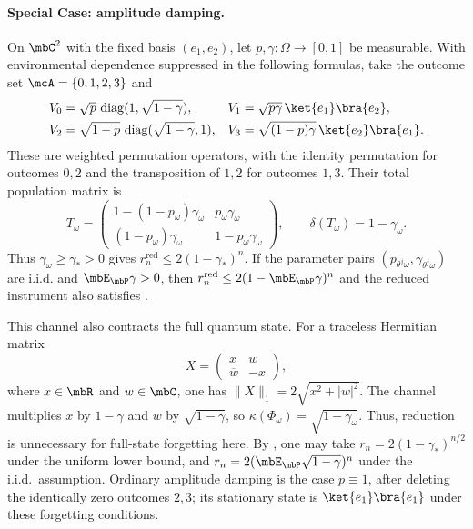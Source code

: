 \documentclass[a4paper]{article}
\numberwithin{equation}{section}   %
\theoremstyle{plain}   %
\theoremstyle{plain}   %
\theoremstyle{examplestyle}
\DeclareMathOperator{\pr}{\mbP}           %
\begin{document}
        \paragraph{Special Case: amplitude damping.}
        \label{par:amplitude-damping}
            On $\mbC^2$ with the fixed basis $(e_1,e_2)$, let $p,\gamma:\Omega\to[0,1]$ be measurable.
            With environmental dependence suppressed in the following formulas, take the outcome set $\mcA=\{0,1,2,3\}$ and
            \[
                \begin{aligned}
                 V_0&=\sqrt p\,\operatorname{diag}(1,\sqrt{1-\gamma}),
                 &V_1&=\sqrt{p\gamma}\,\ket{e_1}\bra{e_2},\\
                 V_2&=\sqrt{1-p}\,\operatorname{diag}(\sqrt{1-\gamma},1),
                 &V_3&=\sqrt{(1-p)\gamma}\,\ket{e_2}\bra{e_1}.
                \end{aligned}
            \]
            These are weighted permutation operators, with the identity permutation for outcomes $0,2$ and the transposition of $1,2$ for outcomes $1,3$.
            Their total population matrix is
            \[
                 T_\omega=\begin{pmatrix}
                 1-(1-p_\omega)\gamma_\omega&p_\omega\gamma_\omega\\
                 (1-p_\omega)\gamma_\omega&1-p_\omega\gamma_\omega
                 \end{pmatrix},
                 \qquad \delta(T_\omega)=1-\gamma_\omega.
            \]
            Thus $\gamma_\omega\ge\gamma_*>0$ gives $r_n^{\mathrm{red}}\le2(1-\gamma_*)^n$.
            If the parameter pairs $(p_{\theta^j\omega},\gamma_{\theta^j\omega})$ are i.i.d. and $\mbE_{\pr}\gamma>0$, then $r_n^{\mathrm{red}}\le2(1-\mbE_{\pr}\gamma)^n$ and the reduced instrument also satisfies .
            
            This channel also contracts the full quantum state.
            For a traceless Hermitian matrix
            \[
                X=\left(\begin{matrix}x&w\\\overline w&-x\end{matrix}\right),
            \]
            where $x\in\mbR$ and $w\in\mbC$, one has $\|X\|_1=2\sqrt{x^2+|w|^2}$.
            The channel multiplies $x$ by $1-\gamma$ and $w$ by $\sqrt{1-\gamma}$, so $\kappa(\Phi_\omega)=\sqrt{1-\gamma_\omega}$.
            Thus, reduction is unnecessary for full-state forgetting here.
            By , one may take $r_n=2(1-\gamma_*)^{n/2}$ under the uniform lower bound, and $r_n=2(\mbE_{\pr}\sqrt{1-\gamma})^n$ under the i.i.d.\ assumption.
            Ordinary amplitude damping is the case $p\equiv1$, after deleting the identically zero outcomes $2,3$; its stationary state is $\ket{e_1}\bra{e_1}$ under these forgetting conditions.
            
\end{document}
